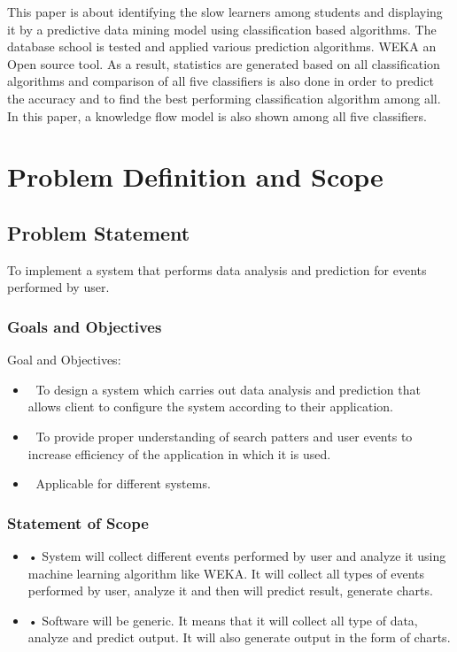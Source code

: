 \documentclass[oneside,a4paper,12pt]{book}
\begin{document}
\begin{enumerate}
\begin{itemize}
This paper is about identifying the slow learners among students and displaying it by a predictive data mining model using classification based algorithms. The database school is tested and applied various prediction algorithms. WEKA an Open source tool. As a result, statistics are generated based on all classification algorithms and comparison of all five classifiers is also done in order to predict the accuracy and to find the best performing classification algorithm among all. In this paper, a knowledge flow model is also shown among all five classifiers.

\end{itemize}


\chapter{Problem Definition and Scope}
\section{Problem Statement}
To implement a system that performs data analysis and prediction for events performed by user.


\subsection{Goals and Objectives}  
Goal and Objectives: 
\begin{itemize}
  	\item 	To design a system which carries out data analysis and prediction that allows client to configure the system according to their application.
	\item 	To provide proper understanding of search patters and user events to increase efficiency of the application in which it is used.
	\item 	Applicable for different systems.
	
\end{itemize}

 \subsection{Statement of Scope} 
		\begin{itemize}  
	\item •	System will collect different events performed by user and analyze it using machine learning algorithm like WEKA. It will collect all types of events performed by user, analyze it and then will predict result, generate charts.
	\item •	Software will be generic. It means that it will collect all type of data, analyze and predict output. It will also generate output in the form of charts.
	

\end{itemize}
\end{enumerate}
\end{document}
